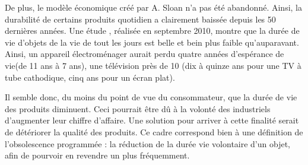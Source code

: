 De plus, le modèle économique créé par A. Sloan n'a pas été abandonné. Ainsi, la durabilité de certains produits quotidien a clairement baissée depuis les 50 dernières années. 
Une étude \cite{opSsg}, réalisée en septembre 2010, montre que la durée de vie d'objets de la vie de tout les jours est belle et bein plus faible qu'auparavant.
Ainsi, un appareil électroménager aurait perdu quatre années d'espérance de vie(de 11 ans à 7 ans), une télévision près de 10 (dix à quinze ans pour une TV à tube cathodique, cinq ans pour un écran plat). 


Il semble donc, du moins du point de vue du consommateur, que la durée de vie des produits diminuent. Ceci pourrait être dû à la volonté des industriels d'augmenter leur chiffre d'affaire. Une solution pour arriver à cette finalité serait de détériorer la qualité des produits. Ce cadre correspond  bien à une définition de l'obsolescence programmée : la réduction de la durée vie volontaire d'un objet, afin de pourvoir en revendre un plus fréquemment. 
